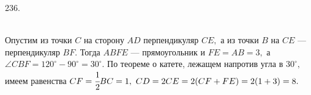 236. \begin{figure}[ht!]
\end{figure}\\
Опустим из точки $C$ на сторону $AD$ перпендикуляр $CE,$ а из точки $B$ на $CE$ --- перпендикуляр $BF.$ Тогда $ABFE$ --- прямоугольник и $FE=AB=3,$ а $\angle CBF=  120^\circ-90^\circ=30^\circ.$ По теореме о катете, лежащем напротив угла в $30^\circ,$ имеем равенства $CF=\cfrac{1}{2}BC=1,\ CD=2CE=2(CF+FE)=2(1+3)=8.$\\
